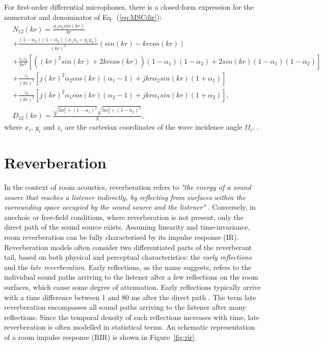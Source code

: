 For first-order differential microphones, there is a closed-form expression for the numerator and denominator of Eq.~(\ref{eq:MSCdir}):
\begin{equation}
	\begin{aligned}
    &N_{12}(k r) =  \frac{\alpha_1 \alpha_2 sin(kr)}{kr} \\
    &+ \frac{(1-\alpha_2)(1-\alpha_2)(x_1x_2+y_1y_2)}{(kr)^3}(sin(kr)-kr cos(kr)) \\
    &+ \frac{z_1 z_2}{kr^3}[ ( (kr)^2 sin(kr) + 2kr cos(kr) )(1-\alpha_1)(1-\alpha_2) 
    + 2 sin(kr)(1-\alpha_1)(1-\alpha_2) ] \\
    &+ \frac{z_1}{(kr)^3}[ j(kr)^2 \alpha_2 cos(kr)(\alpha_1-1) + jkr \alpha_2 sin(kr)(1+\alpha_1) ] \\
    &+ \frac{z_2}{(kr)^3}[ j(kr)^2 \alpha_1 cos(kr)(\alpha_2-1) + jkr \alpha_1 sin(kr)(1+\alpha_2) ],\\
    &D_{12}(kr) =  \frac{\sqrt{3 \alpha_1^2+(1-\alpha_1)^2}\sqrt{3 \alpha_2^2+(1-\alpha_2)^2}}{3},
    \label{eq:closedform_msc}
    \end{aligned}
\end{equation}
where $x_i$, $y_i$ and $z_i$ are the cartesian coordinates of the wave incidence angle $\Omega_i$. .





\section{Reverberation}

In the context of room acoustics, reverberation refers to \textit{"the energy of a sound source that reaches a listener indirectly, by reflecting from surfaces within the surrounding space occupied by the sound source and the listener"} \cite{begault20003}. 
Conversely, in anechoic or free-field conditions, where reverberation is not present, only the direct path of the sound source exists.
Assuming linearity and time-invariance, room reverberation can be fully characterised by its impulse response (IR). \\

Reverberation models often consider two differentiated parts of the reverberant tail, based on both physical and perceptual characteristics: the \textit{early reflections} and the \textit{late reverberation}. 
Early reflections, as the name suggests, refers to the individual sound paths arriving to the listener after a few reflections on the room surfaces, which cause some degree of attenuation. Early reflections typically arrive with a time difference between 1 and 80 ms after the direct path \cite{begault20003}. 
The term late reverberation encompasses all sound paths arriving to the listener after many reflections. Since the temporal density of such reflections increases with time, late reverberation is often modelled in statistical terms.
An schematic representation of a room impulse response (RIR) is shown in Figure~\ref{fig:rir}.\\


